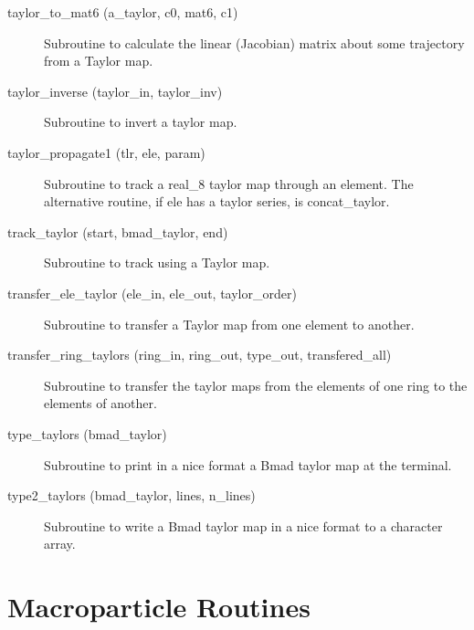 \begin{description}
\item[taylor\_to\_mat6 (a\_taylor, c0, mat6, c1)] \Newline
Subroutine to calculate the linear (Jacobian) matrix about some trajectory from a Taylor map. 

\item[taylor\_inverse (taylor\_in, taylor\_inv)] \Newline
Subroutine to invert a taylor map. 

\item[taylor\_propagate1 (tlr, ele, param)] \Newline
Subroutine to track a real\_8 taylor map through an element. 
The alternative routine, if ele has a taylor series, is concat\_taylor. 

\item[track\_taylor (start, bmad\_taylor, end)] \Newline
Subroutine to track using a Taylor map. 

\item[transfer\_ele\_taylor (ele\_in, ele\_out, taylor\_order)] \Newline 
Subroutine to transfer a Taylor map from one element to another.

\item[transfer\_ring\_taylors (ring\_in, ring\_out, 
                                             type\_out, transfered\_all) ] \Newline 
Subroutine to transfer the taylor maps from the elements of one ring to
the elements of another. 

\item[type\_taylors (bmad\_taylor)] \Newline
Subroutine to print in a nice format a Bmad taylor map at the terminal. 

\item[type2\_taylors (bmad\_taylor, lines, n\_lines)] \Newline
Subroutine to write a Bmad taylor map in a nice format to a character array. 

\end{description}

\section{Macroparticle Routines}
\label{r:macro}    

